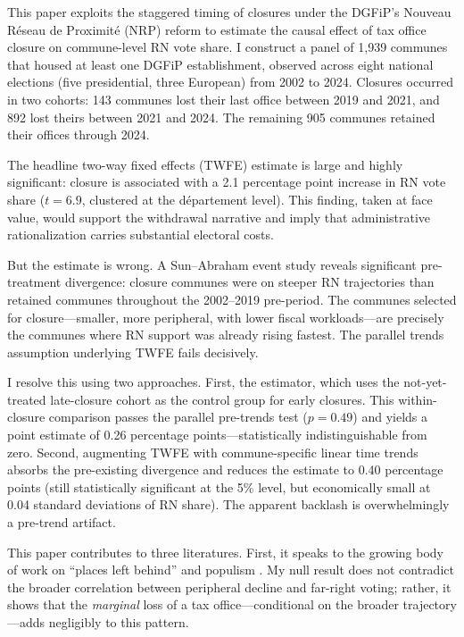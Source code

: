 \documentclass[12pt]{article}
\begin{document}
This paper exploits the staggered timing of closures under the DGFiP's Nouveau R\'{e}seau de Proximit\'{e} (NRP) reform to estimate the causal effect of tax office closure on commune-level RN vote share. I construct a panel of 1,939 communes that housed at least one DGFiP establishment, observed across eight national elections (five presidential, three European) from 2002 to 2024. Closures occurred in two cohorts: 143 communes lost their last office between 2019 and 2021, and 892 lost theirs between 2021 and 2024. The remaining 905 communes retained their offices through 2024.

The headline two-way fixed effects (TWFE) estimate is large and highly significant: closure is associated with a 2.1 percentage point increase in RN vote share ($t=6.9$, clustered at the d\'{e}partement level). This finding, taken at face value, would support the withdrawal narrative and imply that administrative rationalization carries substantial electoral costs.

But the estimate is wrong. A Sun--Abraham event study reveals significant pre-treatment divergence: closure communes were on steeper RN trajectories than retained communes throughout the 2002--2019 pre-period. The communes selected for closure---smaller, more peripheral, with lower fiscal workloads---are precisely the communes where RN support was already rising fastest. The parallel trends assumption underlying TWFE fails decisively.

I resolve this using two approaches. First, the \citet{callaway2021difference} estimator, which uses the not-yet-treated late-closure cohort as the control group for early closures. This within-closure comparison passes the parallel pre-trends test ($p=0.49$) and yields a point estimate of 0.26 percentage points---statistically indistinguishable from zero. Second, augmenting TWFE with commune-specific linear time trends absorbs the pre-existing divergence and reduces the estimate to 0.40 percentage points (still statistically significant at the 5\% level, but economically small at 0.04 standard deviations of RN share). The apparent backlash is overwhelmingly a pre-trend artifact.

This paper contributes to three literatures. First, it speaks to the growing body of work on ``places left behind'' and populism \citep{rodriguezpose2018revenge,autor2020importing,fetzer2019did,dippel2022effect}. My null result does not contradict the broader correlation between peripheral decline and far-right voting; rather, it shows that the \textit{marginal} loss of a tax office---conditional on the broader trajectory---adds negligibly to this pattern.
\end{document}
